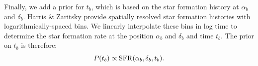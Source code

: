 \documentclass[12pt, preprint]{aastex}
\newcommand{\given}{\,|\,}
\begin{document}
Finally, we add a prior for $t_b$, which is based on the star formation history at $\alpha_b$ and $\delta_b$. Harris \& Zaritsky provide spatially resolved star formation histories with logarithmically-spaced bins. We linearly interpolate these bins in log time to determine the star formation rate at the position $\alpha_b$ and $\delta_b$ and time $t_b$. The prior on $t_b$ is therefore:
\begin{equation}
P(t_b) \propto {\rm SFR}(\alpha_b, \delta_b, t_b).
\end{equation}

\end{document}
